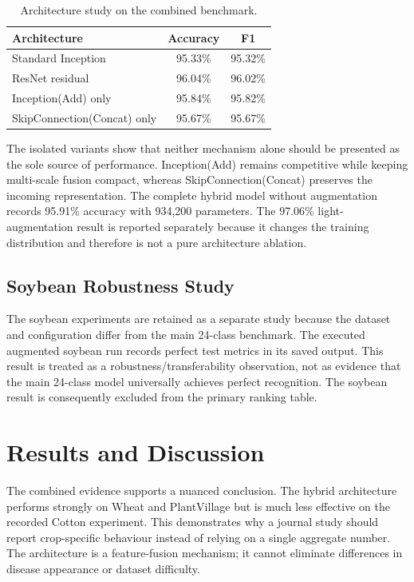 \documentclass[a4paper,fleqn]{cas-dc}
\begin{document}
\begin{table}[!t]
\centering
\caption{Architecture study on the combined benchmark.}
\label{tab:architecture}
\begin{tabular}{lcc}
\toprule
Architecture & Accuracy & F1 \\
\midrule
Standard Inception & 95.33\% & 95.32\% \\
ResNet residual & 96.04\% & 96.02\% \\
Inception(Add) only & 95.84\% & 95.82\% \\
SkipConnection(Concat) only & 95.67\% & 95.67\% \\
\bottomrule
\end{tabular}
\end{table}

The isolated variants show that neither mechanism alone should be presented as the sole source of performance. Inception(Add) remains competitive while keeping multi-scale fusion compact, whereas SkipConnection(Concat) preserves the incoming representation. The complete hybrid model without augmentation records 95.91\% accuracy with 934,200 parameters. The 97.06\% light-augmentation result is reported separately because it changes the training distribution and therefore is not a pure architecture ablation.

\subsection{Soybean Robustness Study}
The soybean experiments are retained as a separate study because the dataset and configuration differ from the main 24-class benchmark. The executed augmented soybean run records perfect test metrics in its saved output. This result is treated as a robustness/transferability observation, not as evidence that the main 24-class model universally achieves perfect recognition. The soybean result is consequently excluded from the primary ranking table.

\section{Results and Discussion}
The combined evidence supports a nuanced conclusion. The hybrid architecture performs strongly on Wheat and PlantVillage but is much less effective on the recorded Cotton experiment. This demonstrates why a journal study should report crop-specific behaviour instead of relying on a single aggregate number. The architecture is a feature-fusion mechanism; it cannot eliminate differences in disease appearance or dataset difficulty.
\end{document}
